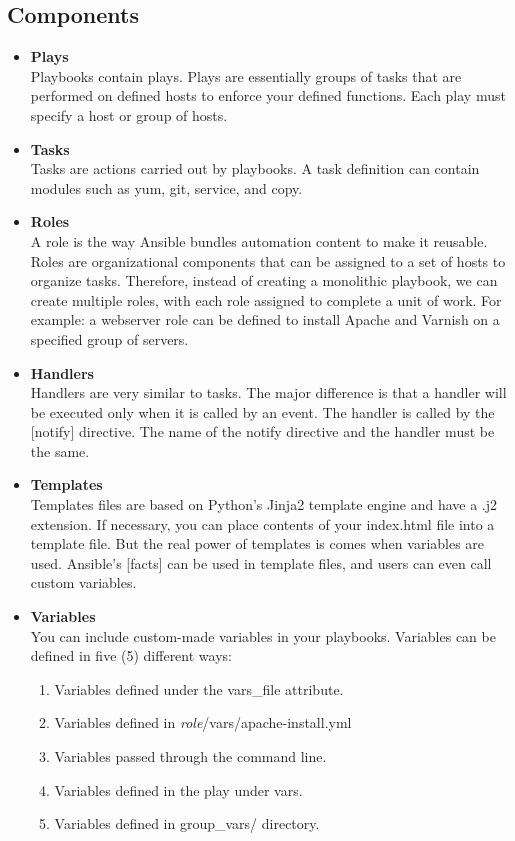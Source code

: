 \documentclass[a4paper, 12pt]{article}
\begin{document}
\subsection{Components}
\begin{itemize}
\item
\textbf{Plays}\\
Playbooks contain plays. Plays are essentially groups of tasks that are performed on defined hosts to enforce your defined functions. Each play must specify a host or group of hosts. 
\item
\textbf{Tasks}\\
Tasks are actions carried out by playbooks. A task definition can contain modules such as yum, git, service, and copy.
\item
\textbf{Roles}\\
A role is the way Ansible bundles automation content to make it reusable. Roles are organizational components that can be assigned to a set of hosts to organize tasks. Therefore, instead of creating a monolithic playbook, we can create multiple roles, with each role assigned to complete a unit of work. For example: a webserver role can be defined to install Apache and Varnish on a specified group of servers.
\item
\textbf{Handlers}\\
Handlers are very similar to tasks. The major difference is that a handler will be executed only when it is called by an event. The handler is called by the [notify] directive. The name of the notify directive and the handler must be the same. 
\item
\textbf{Templates}\\
Templates files are based on Python's Jinja2 template engine and have a .j2 extension. If necessary, you can place contents of your index.html file into a template file. But the real power of templates is comes when variables are used. Ansible's [facts] can be used in template files, and users can even call custom variables.
\item
\textbf{Variables}\\
You can include custom-made variables in your playbooks. Variables can be defined in five (5) different ways:
\begin{enumerate}
\item
Variables defined under the vars\_file attribute.
\item
Variables defined in \textit{role}/vars/apache-install.yml
\item
Variables passed through the command line.
\item
Variables defined in the play under vars.
\item
Variables defined in group\_vars/ directory.
\end{enumerate}
\end{itemize}
\end{document}
